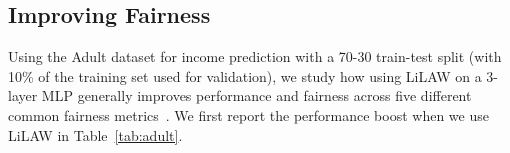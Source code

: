 \documentclass{article}
\theoremstyle{plain}
\theoremstyle{definition}
\theoremstyle{remark}
\begin{document}
\vspace{-0.5em}
\subsection{Improving Fairness}
\label{fairness}

Using the Adult dataset for income prediction with a 70-30 train-test split (with 10\% of the training set used for validation), we study how using LiLAW on a 3-layer MLP generally improves performance and fairness across five different common fairness metrics~\cite{garg2020fairness}. We first report the performance boost when we use LiLAW in Table~\ref{tab:adult}.

\newcommand{\Up}{\textcolor{Green}{\ensuremath{\uparrow}}}
\newcommand{\Upr}{\textcolor{BrickRed}{\ensuremath{\uparrow}}}
\newcommand{\Downg}{\textcolor{Green}{\ensuremath{\downarrow}}}
\newcommand{\Down}{\textcolor{BrickRed}{\ensuremath{\downarrow}}}
\newcommand{\Eq}{\textcolor{gray}{\ensuremath{\leftrightarrow}}}
\end{document}
